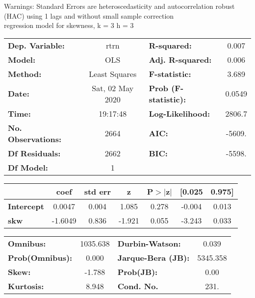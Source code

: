 Warnings: \newline
 [1] Standard Errors are heteroscedasticity and autocorrelation robust (HAC) using 1 lags and without small sample correction\\ 

regression model for skewness, k = 3 h = 3\begin{center}
\begin{tabular}{lclc}
\toprule
\textbf{Dep. Variable:}    &       rtrn       & \textbf{  R-squared:         } &     0.007   \\
\textbf{Model:}            &       OLS        & \textbf{  Adj. R-squared:    } &     0.006   \\
\textbf{Method:}           &  Least Squares   & \textbf{  F-statistic:       } &     3.689   \\
\textbf{Date:}             & Sat, 02 May 2020 & \textbf{  Prob (F-statistic):} &   0.0549    \\
\textbf{Time:}             &     19:17:48     & \textbf{  Log-Likelihood:    } &    2806.7   \\
\textbf{No. Observations:} &        2664      & \textbf{  AIC:               } &    -5609.   \\
\textbf{Df Residuals:}     &        2662      & \textbf{  BIC:               } &    -5598.   \\
\textbf{Df Model:}         &           1      & \textbf{                     } &             \\
\bottomrule
\end{tabular}
\begin{tabular}{lcccccc}
                   & \textbf{coef} & \textbf{std err} & \textbf{z} & \textbf{P$> |$z$|$} & \textbf{[0.025} & \textbf{0.975]}  \\
\midrule
\textbf{Intercept} &       0.0047  &        0.004     &     1.085  &         0.278        &       -0.004    &        0.013     \\
\textbf{skw}       &      -1.6049  &        0.836     &    -1.921  &         0.055        &       -3.243    &        0.033     \\
\bottomrule
\end{tabular}
\begin{tabular}{lclc}
\textbf{Omnibus:}       & 1035.638 & \textbf{  Durbin-Watson:     } &    0.039  \\
\textbf{Prob(Omnibus):} &   0.000  & \textbf{  Jarque-Bera (JB):  } & 5345.358  \\
\textbf{Skew:}          &  -1.788  & \textbf{  Prob(JB):          } &     0.00  \\
\textbf{Kurtosis:}      &   8.948  & \textbf{  Cond. No.          } &     231.  \\
\bottomrule
\end{tabular}
\end{center}

